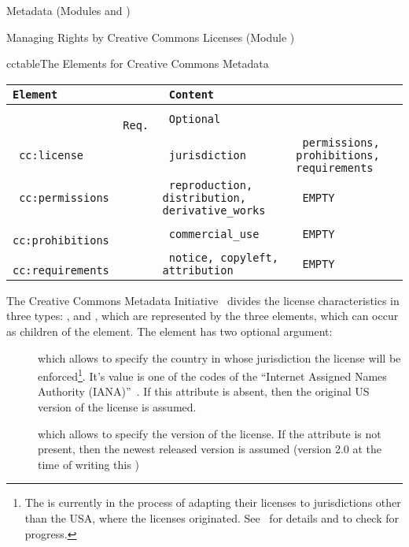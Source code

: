 \begin{tchapter}[id=metadata,short=Metadata]{Metadata (Modules {} and  {})}
\begin{tsection}[id=creativecommons,short=Managing Rights]{Managing Rights by Creative
    Commons Licenses (Module {})}
\begin{myfig}{cctable}{The {\omdoc} Elements for Creative Commons Metadata}
\begin{scriptsize}
\begin{tabular}{|>{\tt}l|>{\tt}l|>{\tt}p{}|>{\tt}l|}\hline
{\rm Element}& \multicolumn{2}{l|}{Attributes\hspace*{2.25cm}} & Content  \\\hline
             & {\rm Req.}  & {\rm Optional}    &          \\\hline\hline
 cc:license      & & jurisdiction    &  permissions, prohibitions, requirements  \\\hline
 cc:permissions  & & reproduction, distribution, derivative\_works & EMPTY\\\hline
 cc:prohibitions & & commercial\_use & EMPTY \\\hline
 cc:requirements & & notice, copyleft,  attribution & EMPTY \\\hline
\end{tabular}
\end{scriptsize}
\end{myfig}

The Creative Commons Metadata Initiative~\cite{URL:creativecommons} divides the license
characteristics in three types: {}, {} and
{}, which are represented by the three elements, which can occur as
children of the {} element. The {}
element has two optional argument:
\begin{description}
\item[{}] which allows to specify the country
  in whose jurisdiction the license will be enforced\footnote{The {} is currently in the process of adapting their licenses to
    jurisdictions other than the USA, where the licenses
    originated. See~\cite{URL:creativecommonsworldwide} for details and to check for
    progress.}. It's value is one of the {} codes of the
  ``Internet Assigned Names Authority (IANA)''~\cite{IANA:TLD}. If this attribute is
  absent, then the original US version of the license is assumed.
\item[{}] which allows to specify the version of the
  license. If the attribute is not present, then the newest released version is assumed
  (version 2.0 at the time of writing this {\report})
\end{description}


\end{tsection}
\end{tchapter}

